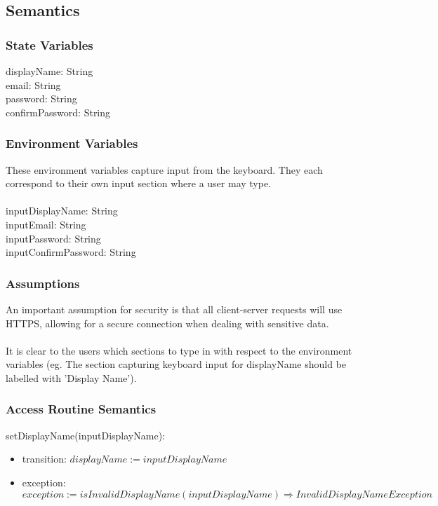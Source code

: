 \documentclass[12pt, titlepage]{article}
\begin{document}
\subsection{Semantics}

\subsubsection{State Variables}
displayName: String \\ 
email: String \\ 
password: String  \\ 
confirmPassword: String  \\

\subsubsection{Environment Variables}

These environment variables capture input from the keyboard. They each correspond to their own input section where a user may type. \\ \\
inputDisplayName: String \\ 
inputEmail: String \\ 
inputPassword: String  \\ 
inputConfirmPassword: String  \\ 

\subsubsection{Assumptions}
An important assumption for security is that all client-server requests will use HTTPS, allowing for a secure connection when dealing with sensitive data.
\\
\\ It is clear to the users which sections to type in with respect to the environment variables (eg. The section capturing keyboard input for displayName should be labelled with 'Display Name'). 

\subsubsection{Access Routine Semantics}

\noindent setDisplayName(inputDisplayName):
\begin{itemize}
\item transition: $displayName := inputDisplayName$
\item exception: \\$exception := isInvalidDisplayName(inputDisplayName) \Rightarrow InvalidDisplayNameException$
\end{itemize}
\end{document}
